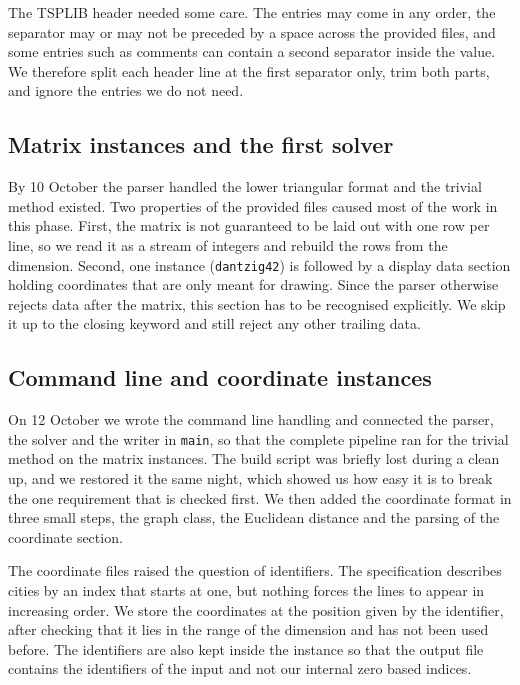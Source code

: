 \documentclass[11pt,a4paper]{article}
\begin{document}
The TSPLIB header needed some care. The entries may come in any order, the separator may or may not be preceded by a space across the provided files, and some entries such as comments can contain a second separator inside the value. We therefore split each header line at the first separator only, trim both parts, and ignore the entries we do not need.

\subsection{Matrix instances and the first solver}

By 10 October the parser handled the lower triangular format and the trivial method existed. Two properties of the provided files caused most of the work in this phase. First, the matrix is not guaranteed to be laid out with one row per line, so we read it as a stream of integers and rebuild the rows from the dimension. Second, one instance (\texttt{dantzig42}) is followed by a display data section holding coordinates that are only meant for drawing. Since the parser otherwise rejects data after the matrix, this section has to be recognised explicitly. We skip it up to the closing keyword and still reject any other trailing data.

\subsection{Command line and coordinate instances}

On 12 October we wrote the command line handling and connected the parser, the solver and the writer in \texttt{main}, so that the complete pipeline ran for the trivial method on the matrix instances. The build script was briefly lost during a clean up, and we restored it the same night, which showed us how easy it is to break the one requirement that is checked first. We then added the coordinate format in three small steps, the graph class, the Euclidean distance and the parsing of the coordinate section.

The coordinate files raised the question of identifiers. The specification describes cities by an index that starts at one, but nothing forces the lines to appear in increasing order. We store the coordinates at the position given by the identifier, after checking that it lies in the range of the dimension and has not been used before. The identifiers are also kept inside the instance so that the output file contains the identifiers of the input and not our internal zero based indices.
\end{document}
